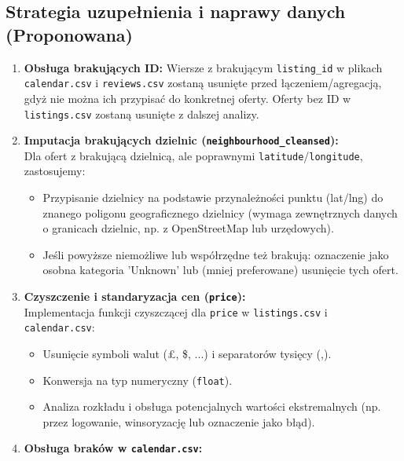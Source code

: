 \documentclass[a4paper,11pt]{article}
\begin{document}
\subsection{Strategia uzupełnienia i naprawy danych (Proponowana)}

\begin{tcolorbox}[enhanced,breakable,colback=blue!5!white,colframe=blue!40!black,title=Proponowane działania naprawcze]
\begin{enumerate}[label=\textbf{Działanie \arabic*.},leftmargin=2cm,itemsep=5pt]
  \item \textbf{Obsługa brakujących ID:} Wiersze z brakującym \texttt{listing\_id} w plikach \texttt{calendar.csv} i \texttt{reviews.csv} zostaną usunięte przed łączeniem/agregacją, gdyż nie można ich przypisać do konkretnej oferty. Oferty bez ID w \texttt{listings.csv} zostaną usunięte z dalszej analizy.
  \item \textbf{Imputacja brakujących dzielnic (\texttt{neighbourhood\_cleansed}):}\\
    Dla ofert z brakującą dzielnicą, ale poprawnymi \texttt{latitude}/\texttt{longitude}, zastosujemy:
    \begin{itemize}
      \item Przypisanie dzielnicy na podstawie przynależności punktu (lat/lng) do znanego poligonu geograficznego dzielnicy (wymaga zewnętrznych danych o granicach dzielnic, np. z OpenStreetMap lub urzędowych).
      \item Jeśli powyższe niemożliwe lub współrzędne też brakują: oznaczenie jako osobna kategoria 'Unknown' lub (mniej preferowane) usunięcie tych ofert.
    \end{itemize}
  \item \textbf{Czyszczenie i standaryzacja cen (\texttt{price}):}\\
    Implementacja funkcji czyszczącej dla \texttt{price} w \texttt{listings.csv} i \texttt{calendar.csv}:
    \begin{itemize}
      \item Usunięcie symboli walut (£, \$, ...) i separatorów tysięcy (,).
      \item Konwersja na typ numeryczny (\texttt{float}).
      \item Analiza rozkładu i obsługa potencjalnych wartości ekstremalnych (np. przez logowanie, winsoryzację lub oznaczenie jako błąd).
    \end{itemize}
  \item \textbf{Obsługa braków w \texttt{calendar.csv}:}\\

\end{enumerate}
\end{tcolorbox}
\end{document}
